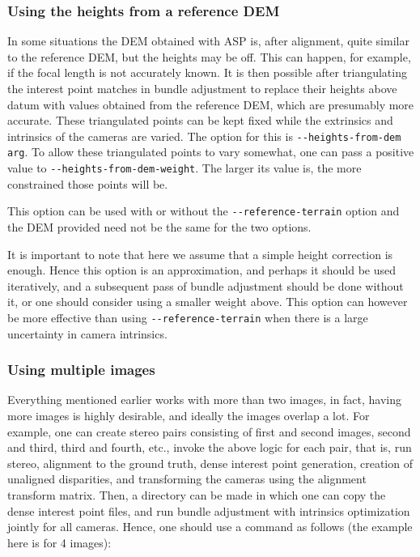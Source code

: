 \subsubsection{Using the heights from a reference DEM}

In some situations the DEM obtained with ASP is, after alignment, quite
similar to the reference DEM, but the heights may be off. This can
happen, for example, if the focal length is not accurately known. It is
then possible after triangulating the interest point matches in bundle
adjustment to replace their heights above datum with values obtained
from the reference DEM, which are presumably more accurate. These
triangulated points can be kept fixed while the extrinsics and
intrinsics of the cameras are varied. The option for this is
\texttt{-\/-heights-from-dem arg}. To allow these triangulated
points to vary somewhat, one can pass a positive value to 
\texttt{-\/-heights-from-dem-weight}. The larger its value is,
the more constrained those points will be.  

This option can be used with or without the \texttt{-\/-reference-terrain}
option and the DEM provided need not be the same for the two options.

It is important to note that here we assume that a simple height correction 
is enough. Hence this option is an approximation, and perhaps it should be used
iteratively, and a subsequent pass of bundle adjustment should be done without it,
or one should consider using a smaller weight above.
This option can however be more effective than using \texttt{-\/-reference-terrain}
when there is a large uncertainty in camera intrinsics. 

\subsubsection{Using multiple images}

Everything mentioned earlier works with more than two images, in fact,
having more images is highly desirable, and ideally the images overlap a
lot. For example, one can create stereo pairs consisting of first and
second images, second and third, third and fourth, etc., invoke the
above logic for each pair, that is, run stereo, alignment to the ground
truth, dense interest point generation, creation of unaligned
disparities, and transforming the cameras using the alignment transform
matrix. Then, a directory can be made in which one can copy the dense
interest point files, and run bundle adjustment with intrinsics
optimization jointly for all cameras. Hence, one should use a command as
follows (the example here is for 4 images):

